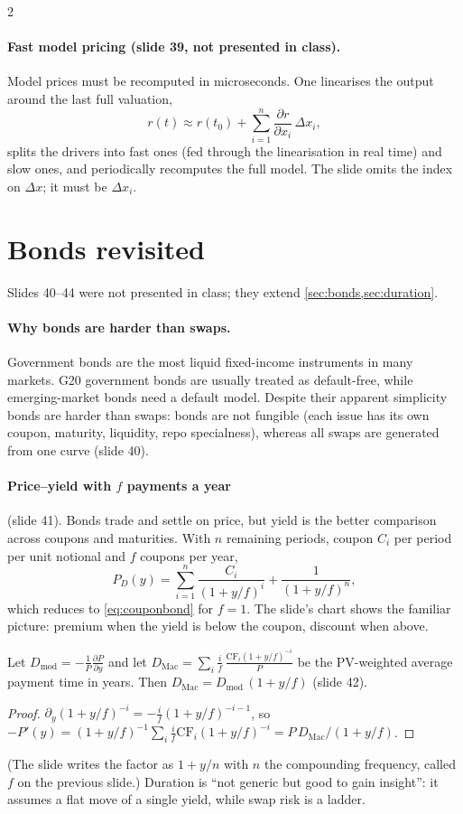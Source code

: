 \begin{paracol}{2}
\paragraph{Fast model pricing (slide 39, not presented in class).} Model prices must be recomputed in microseconds.
One linearises the output around the last full valuation,
\[
  r(t)\approx r(t_0)+\sum_{i=1}^{n}\frac{\partial r}{\partial x_i}\,\Delta x_i ,
\]
splits the drivers into fast ones (fed through the linearisation in real time) and slow ones, and periodically
recomputes the full model. The slide omits the index on $\Delta x$; it must be $\Delta x_i$.

\section{Bonds revisited}\label{ch06:sec-bonds}
Slides 40--44 were not presented in class; they extend \cref{sec:bonds,sec:duration}.

\paragraph{Why bonds are harder than swaps.} Government bonds are the most liquid fixed-income instruments in many
markets. G20 government bonds are usually treated as default-free, while emerging-market bonds need a default model.
Despite their apparent simplicity bonds are harder than swaps: bonds are not fungible (each issue has its own
coupon, maturity, liquidity, repo specialness), whereas all swaps are generated from one curve (slide 40).

\paragraph{Price--yield with $f$ payments a year} (slide 41). Bonds trade and settle on price, but yield is the
better comparison across coupons and maturities. With $n$ remaining periods, coupon $C_i$ per period per unit
notional and $f$ coupons per year,
\[
  P_D(y)=\sum_{i=1}^{n}\frac{C_i}{(1+y/f)^{i}}+\frac{1}{(1+y/f)^{n}},
\]
which reduces to \eqref{eq:couponbond} for $f=1$. The slide's chart shows the familiar picture: premium when the
yield is below the coupon, discount when above.

\begin{proposition}
Let $D_{\mathrm{mod}}=-\frac1P\frac{\partial P}{\partial y}$ and let $D_{\mathrm{Mac}}=\sum_i\frac{i}{f}\,
\frac{\mathrm{CF}_i(1+y/f)^{-i}}{P}$ be the PV-weighted average payment time in years. Then
$D_{\mathrm{Mac}}=D_{\mathrm{mod}}\,(1+y/f)$ (slide 42).
\end{proposition}
\begin{proof}
$\partial_y(1+y/f)^{-i}=-\frac{i}{f}(1+y/f)^{-i-1}$, so
$-P'(y)=(1+y/f)^{-1}\sum_i\frac if\mathrm{CF}_i(1+y/f)^{-i}=P\,D_{\mathrm{Mac}}/(1+y/f)$.
\end{proof}
(The slide writes the factor as $1+y/n$ with $n$ the compounding frequency, called $f$ on the previous slide.)
Duration is ``not generic but good to gain insight'': it assumes a flat move of a single yield, while swap risk is
a ladder.


\end{paracol}
